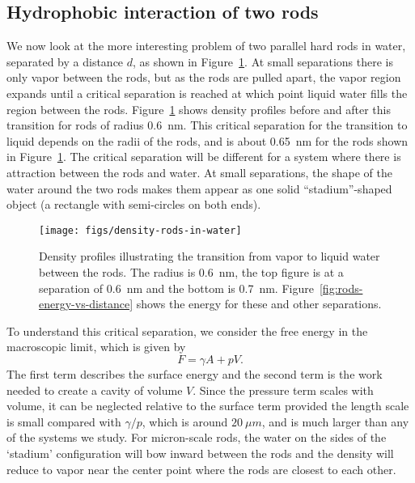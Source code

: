 \documentclass[twocolumn,amsmath,amssymb,prl]{revtex4-1}
\begin{document}
\subsection{Hydrophobic interaction of two rods}

We now look at the more interesting problem of two parallel hard rods
in water, separated by a distance $d$, as shown in
Figure~\ref{fig:density-rods}.  At small separations there is only vapor
between the rods, but as the rods are pulled apart, the vapor region
expands until a critical separation is reached at which point liquid
water fills the region between the rods.
Figure~\ref{fig:density-rods} shows density profiles before and after
this transition for rods of radius 0.6~nm. This critical separation
for the transition to liquid depends on the radii of the rods, and is
about 0.65~nm for the rods shown in Figure~\ref{fig:density-rods}.
The critical separation will be different for a system where there is
attraction between the
rods and water.  At small separations, the shape of the water around the two
rods makes them appear as one solid ``stadium''-shaped object
(a rectangle with semi-circles on both ends).


\begin{figure}
\begin{center}
\texttt{[image: figs/density-rods-in-water]}
\end{center}
\caption{ Density profiles illustrating the transition from vapor 
to liquid water between the rods. The radius is 0.6~nm, the top figure is
at a separation of 0.6~nm and the
bottom is 0.7~nm. Figure~\ref{fig:rods-energy-vs-distance} shows
the energy for these and other separations.}
\label{fig:density-rods}
\end{figure}

To understand this critical separation, we consider the free energy in
the macroscopic limit, which is given by
\begin{equation}
F = \gamma A + pV.
\end{equation}
The first term describes the surface energy and the second term is the
work needed to create a cavity of volume $V$. Since the pressure term
scales with volume, it can be neglected relative to the surface term
provided the length scale is small compared with $\gamma / p$, which
is around $20~\mu m$, and is much larger than any of the systems we
study. For micron-scale rods, the water on the sides of the `stadium'
configuration will bow inward between the rods and the density will
reduce to vapor near the center point where the rods are closest to
each other.
\end{document}
